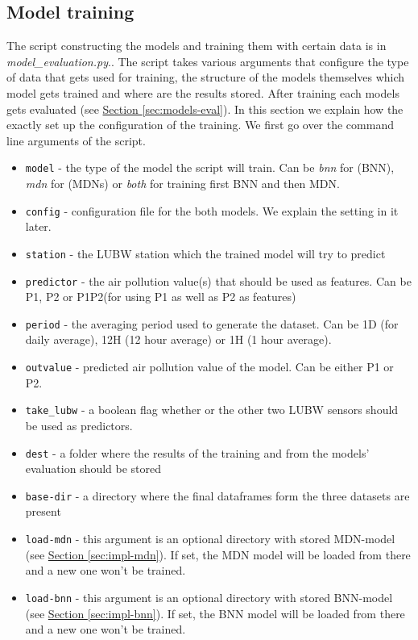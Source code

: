 \documentclass[12pt,a4paper,twoside]{scrartcl}
\numberwithin{equation}{section}
\newcommand{\refsec}[1]{\hyperref[#1]{Section \ref*{#1}}}
\begin{document}
\subsection{Model training}
\label{sec:models-train}
The script constructing the models and training them with certain data is in \emph{model_evaluation.py}.. The script takes various arguments that configure the type of data that gets used for training, the structure of the models themselves which model gets trained and where are the results stored. After training each models gets evaluated (see \refsec{sec:models-eval}). In this section we explain how the exactly set up the configuration of the training. We first go over the command line arguments of the script.
\begin{itemize}
\item \texttt{\-\-model} - the type of the model the script will train. Can be \emph{bnn} for (BNN), \emph{mdn} for (MDNs) or \emph{both} for training first BNN and then MDN.
\item \texttt{\-\-config} - configuration file for the both models. We explain the setting in it later.
\item \texttt{\-\-station} - the LUBW station which the trained model will try to predict
\item \texttt{\-\-predictor} - the air pollution value(s) that should be used as features. Can be P1, P2 or P1P2(for using P1 as well as P2 as features)
\item \texttt{\-\-period} - the averaging period used to generate the dataset. Can be 1D (for daily average), 12H (12 hour average) or 1H (1 hour average).
\item \texttt{\-\-outvalue} - predicted air pollution value of the model. Can be either P1 or P2.
\item \texttt{\-\-take_lubw} - a boolean flag whether or the other two LUBW sensors should be used as predictors.
\item \texttt{\-\-dest} - a folder where the results of the training and from the models' evaluation should be stored
\item \texttt{\-\-base-dir} - a directory where the final dataframes form the three datasets are present
\item \texttt{\-\-load-mdn} - this argument is an optional directory with stored MDN-model (see \refsec{sec:impl-mdn}). If set, the MDN model will be loaded from there and a new one won't be trained.
\item \texttt{\-\-load-bnn} - this argument is an optional directory with stored BNN-model (see \refsec{sec:impl-bnn}). If set, the BNN  model will be loaded from there and a new one won't be trained.
\end{itemize}
\end{document}
